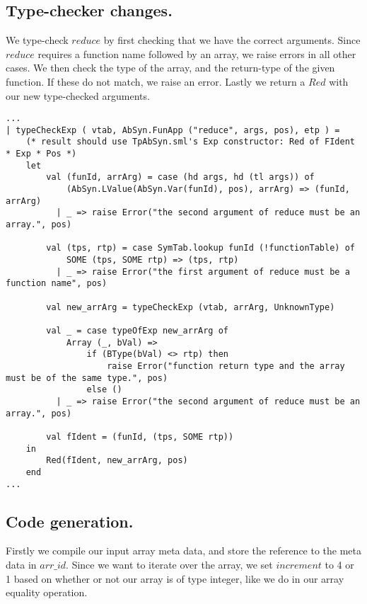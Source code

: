 \documentclass[12pt]{article}
\begin{document}
\subsection{Type-checker changes.}

We type-check $reduce$ by first checking that we have the correct arguments. Since $reduce$ requires a function name followed by an array, we raise errors in all other cases. We then check the type of the array, and the return-type of the given function. If these do not match, we raise an error. Lastly we return a $Red$ with our new type-checked arguments.

\begin{lstlisting}[caption=Extend Type.sml typeCheckExp to handle reduce.]
...
| typeCheckExp ( vtab, AbSyn.FunApp ("reduce", args, pos), etp ) =
    (* result should use TpAbSyn.sml's Exp constructor: Red of FIdent * Exp * Pos *)
    let 
        val (funId, arrArg) = case (hd args, hd (tl args)) of 
            (AbSyn.LValue(AbSyn.Var(funId), pos), arrArg) => (funId, arrArg)
          | _ => raise Error("the second argument of reduce must be an array.", pos)
           
        val (tps, rtp) = case SymTab.lookup funId (!functionTable) of 
            SOME (tps, SOME rtp) => (tps, rtp)
          | _ => raise Error("the first argument of reduce must be a function name", pos)

        val new_arrArg = typeCheckExp (vtab, arrArg, UnknownType)

        val _ = case typeOfExp new_arrArg of 
            Array (_, bVal) => 
                if (BType(bVal) <> rtp) then
                    raise Error("function return type and the array must be of the same type.", pos)
                else ()
          | _ => raise Error("the second argument of reduce must be an array.", pos)

        val fIdent = (funId, (tps, SOME rtp))
    in
        Red(fIdent, new_arrArg, pos)
    end
...
\end{lstlisting} 

\subsection{Code generation.}

Firstly we compile our input array meta data, and store the reference to the meta data in $arr\_id$. Since we want to iterate over the array, we set $increment$ to 4 or 1 based on whether or not our array is of type integer, like we do in our array equality operation.\\
\end{document}
